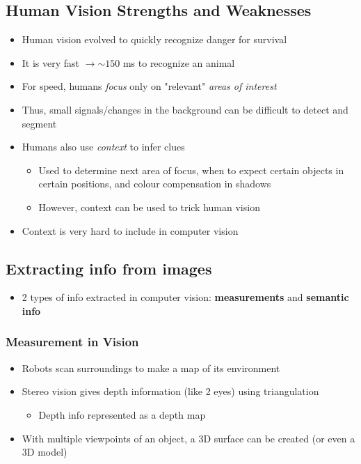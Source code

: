 \documentclass[letterpaper,12pt]{article}
\newcommand{\lra}{\ensuremath{\longrightarrow{}}}
\begin{document}
\subsection{Human Vision Strengths and Weaknesses}
\begin{itemize}
 \item Human vision evolved to quickly recognize danger for survival
 \item It is very fast \lra $\sim150$ ms to recognize an animal
 \item For speed, humans \textit{focus} only on "relevant" \textit{areas of interest}
 \item Thus, small signals/changes in the background can be difficult to detect and segment
 \item Humans also use \textit{context} to infer clues
       \begin{itemize}
        \item Used to determine next area of focus, when to expect certain objects in certain positions, and colour compensation in shadows
        \item However, context can be used to trick human vision
       \end{itemize}
 \item Context is very hard to include in computer vision
\end{itemize}

\subsection{Extracting info from images}

\begin{itemize}
 \item 2 types of info extracted in computer vision: \textbf{measurements} and \textbf{semantic info}
\end{itemize}

\subsubsection{Measurement in Vision}
\begin{itemize}
 \item Robots scan surroundings to make a map of its environment
 \item Stereo vision gives depth information (like 2 eyes) using triangulation
       \begin{itemize}
        \item Depth info represented as a depth map
       \end{itemize}
 \item With multiple viewpoints of an object, a 3D surface can be created (or even a 3D model)
\end{itemize}
\end{document}
